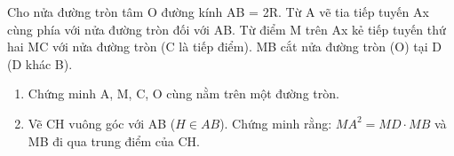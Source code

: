 \begin{ex}
Cho nửa đường tròn tâm O đường kính AB = 2R. Từ A vẽ tia tiếp tuyến Ax cùng phía với nửa đường tròn đối với AB. Từ điểm M trên Ax kẻ tiếp tuyến thứ hai MC với nửa đường tròn (C là tiếp điểm). MB cắt nửa đường tròn (O) tại D (D khác B).
	\begin{enumerate}
		\item[a)] Chứng minh A, M, C, O cùng nằm trên một đường tròn.
		\item[b)] Vẽ CH vuông góc với AB ($H \in AB$). Chứng minh rằng: $MA^2 = MD \cdot MB$ và MB đi qua trung điểm của CH.
	\end{enumerate}
\end{ex}
